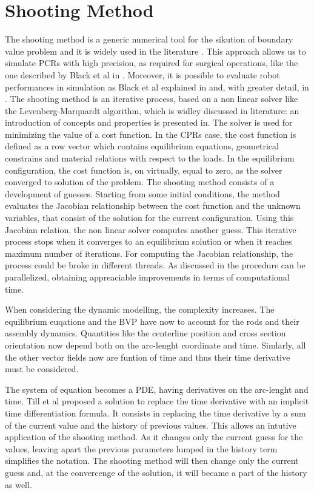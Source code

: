 \documentclass{thesisreport}
\begin{document}
 \section{Shooting Method}
 The shooting method is a generic numerical tool for the sikution of boundary value problem and it is widely used in the literature \cite{black_parallel_2018}\cite{black_modeling_2017}\cite{florian_geometrically_2020}. This approach allows us to simulate PCRs with high precision, as required for surgical operations, like the one described by Black et al in \cite{black_modeling_2017}. Moreover, it is possible to evaluate robot performances in simulation as Black et al explained in \cite{black_parallel_2018} and, with greater detail, in \cite{black_modeling_2017}. The shooting method is an iterative process, based on a non linear solver like the Levenberg-Marquardt algorithm, which is widley discussed in literature: an introduction of concepts and properties is presented in\cite{lourakis_brief_nodate}. 
 The solver is used for minimizing the value of a cost function\cite{florian_geometrically_2020}. In the CPRs case, the cost function is defined as a row vector which contains equilibrium equations, geometrical constrains and material relations with respect to the loads. In the equilibrium configuration, the cost function is, on virtually, equal to zero, as the solver converged to solution of the problem. 
 The shooting method consists of a development of guesses. Starting from some initial conditions, the method evaluates the Jacobian relationship between the cost function and the unknown variables, that consist of the solution for the current configuration. Using this Jacobian relation, the non linear solver computes another guess. This iterative process stops when it converges to an equilibrium solution or when it reaches maximum number of iterations. For computing the Jacobian relationship, the process could be broke in different threads. As discussed in \cite{till_efficient_2015} the procedure can be parallelized, obtaining appreaciable improvements in terms of computational time.  
 
 When considering the dynamic modelling, the complexity increases. The equilibrium euqations and the BVP have now to account for the rods and their assembly dynamics. Quantities like the centerline position and cross section orientation now depend both on the arc-lenght coordinate and time. Simlarly, all the other vector fields now are funtion of time and thus their time derivative must be considered. 
 
 The system of equation becomes a PDE, having derivatives on the arc-lenght and time. Till et al \cite{till_real-time_2019} proposed a solution to replace the time derivative with an implicit time differentiation formula. It consists in replacing the time derivative by a sum of the current value and the history of previous values. This allows an intutive application of the shooting method. As it changes only the current guess for the values, leaving apart the previous parameters lumped in the history term simplifies the notation. The shooting method will then change only the current guess and, at the convercenge of the solution, it will became a part of the history as well. 
 
\end{document}

